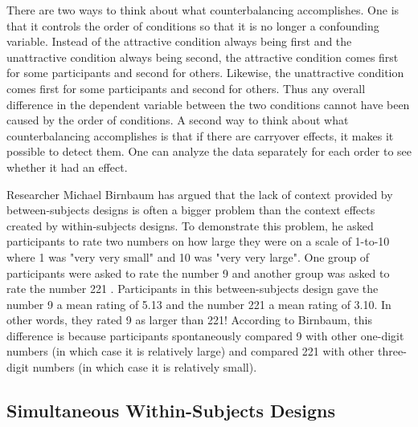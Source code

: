 There are two ways to think about what counterbalancing accomplishes. One is that it controls the order of conditions so that it is no longer a confounding variable. Instead of the attractive condition always being first and the unattractive condition always being second, the attractive condition comes first for some participants and second for others. Likewise, the unattractive condition comes first for some participants and second for others. Thus any overall difference in the dependent variable between the two conditions cannot have been caused by the order of conditions. A second way to think about what counterbalancing accomplishes is that if there are carryover effects, it makes it possible to detect them. One can analyze the data separately for each order to see whether it had an effect.

\color{fgcolor}\begin{kframe}
Researcher Michael Birnbaum has argued that the lack of context provided by between-subjects designs is often a bigger problem than the context effects created by within-subjects designs. To demonstrate this problem, he asked participants to rate two numbers on how large they were on a scale of 1-to-10 where 1 was "very very small" and 10 was "very very large". One group of participants were asked to rate the number 9 and another group was asked to rate the number 221 \citep{birnbaum_how_1999}. Participants in this between-subjects design gave the number 9 a mean rating of 5.13 and the number 221 a mean rating of 3.10. In other words, they rated 9 as larger than 221! According to Birnbaum, this difference is because participants spontaneously compared 9 with other one-digit numbers (in which case it is relatively large) and compared 221 with other three-digit numbers (in which case it is relatively small).
\end{kframe}

\subsection{Simultaneous Within-Subjects Designs}

